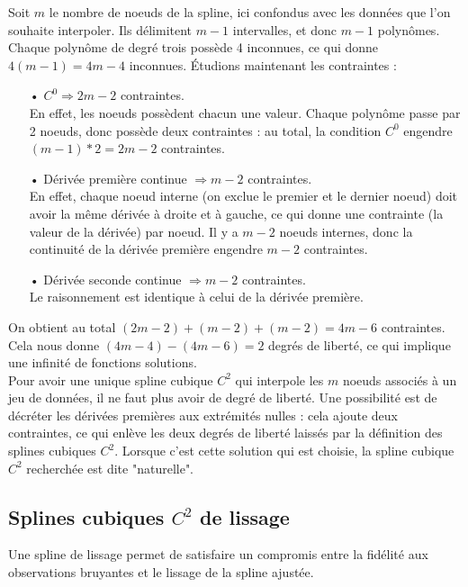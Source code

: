 \documentclass[a4paper,12pt]{article} %
\begin{document}
            Soit $m$ le nombre de noeuds de la spline, ici confondus avec les données que l'on souhaite interpoler. Ils délimitent $m-1$ intervalles, et donc $m-1$ polynômes. Chaque polynôme de degré trois possède 4 inconnues, ce qui donne $4(m-1) = 4m - 4$ inconnues. Étudions maintenant les contraintes : 
            \begin{itemize}
                \item[•] $C^0 \Rightarrow 2m-2$ contraintes.\\ 
                En effet, les noeuds possèdent chacun une valeur. Chaque polynôme passe par 2 noeuds, donc possède deux contraintes : au total, la condition $C^0$ engendre $(m-1)*2 = 2m-2$ contraintes. 
                \item[•] Dérivée première continue $\Rightarrow m-2$ contraintes. \\
                En effet, chaque noeud interne (on exclue le premier et le dernier noeud) doit avoir la même dérivée à droite et à gauche, ce qui donne une contrainte (la valeur de la dérivée) par noeud. Il y a $m-2$ noeuds internes, donc la continuité de la dérivée première engendre $m-2$ contraintes.
                \item[•] Dérivée seconde continue $\Rightarrow m-2$ contraintes. \\
                Le raisonnement est identique à celui de la dérivée première.
            \end{itemize}
            On obtient au total $(2m-2) + (m-2) + (m-2) = 4m-6$ contraintes. Cela nous donne $(4m-4) - (4m-6) = 2$ degrés de liberté, ce qui implique une infinité de fonctions solutions.\\
            
            Pour avoir une unique spline cubique $C^2$ qui interpole les $m$ noeuds associés à un jeu de données, il ne faut plus avoir de degré de liberté. Une possibilité est de décréter les dérivées premières aux extrémités nulles : cela ajoute deux contraintes, ce qui enlève les deux degrés de liberté laissés par la définition des splines cubiques $C^2$. Lorsque c'est cette solution qui est choisie, la spline cubique $C^2$ recherchée est dite "naturelle".
            
		\subsection{Splines cubiques $C^2$ de lissage}
		
		    Une spline de lissage permet de satisfaire un compromis entre la fidélité aux observations bruyantes et le lissage de la spline ajustée.
		
\end{document}

